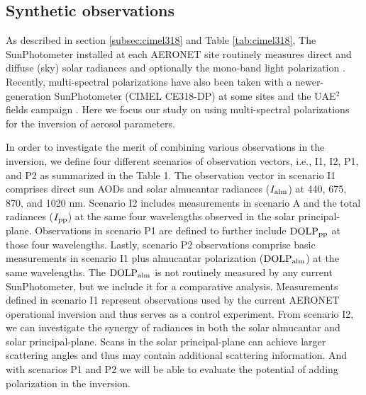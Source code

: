 \subsection{Synthetic observations}

As described in section \ref{subsec:cimel318} and Table \ref{tab:cimel318}, 
The SunPhotometer installed at each AERONET site routinely measures direct and
diffuse (sky) solar radiances and optionally the mono-band light 
polarization \citep{Holben98}. Recently, multi-spectral polarizations 
have also been taken with a newer-generation SunPhotometer (CIMEL CE318-DP) 
at some sites \citep{Li09} and the UAE$^2$ fields campaign \citet{Reid08}.
 Here we focus our study on using multi-spectral polarizations 
for the inversion of aerosol parameters. 

In order to investigate the merit of combining various observations in the
inversion, we define four different scenarios of observation vectors, i.e., I1,
I2, P1, and P2 as summarized in the Table 1. The observation vector in scenario
I1 comprises direct sun AODs and solar almucantar radiances ($I_\text{alm}$) at 440,
675, 870, and 1020 nm. Scenario I2 includes measurements in scenario A and the
total radiances ($I_\text{pp}$) at the same four wavelengths observed in the solar
principal-plane. Observations in scenario P1 are defined to further include
$\text{DOLP}_\text{pp}$ at those four wavelengths. Lastly, scenario P2 observations comprise
basic measurements in scenario I1 plus almucantar polarization ($\text{DOLP}_\text{alm}$) at
the same wavelengths. The $\text{DOLP}_\text{alm}$ is not routinely measured by any current
SunPhotometer, but we include it for a comparative analysis. Measurements
defined in scenario I1 represent observations used by the current AERONET
operational inversion and thus serves as a control experiment. From scenario
I2, we can investigate the synergy of radiances in both the solar almucantar
and solar principal-plane. Scans in the solar principal-plane can achieve
larger scattering angles and thus may contain additional scattering
information. And with scenarios P1 and P2 we will be able to evaluate the
potential of adding polarization in the inversion. 

